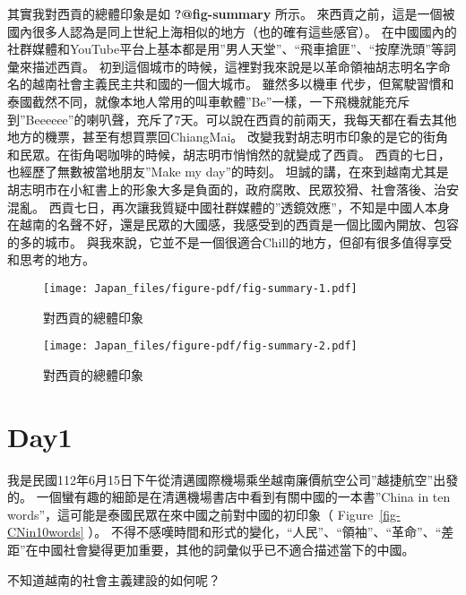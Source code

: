 \documentclass[
  a4paper,
]{ctexart}
\begin{document}
其實我對西貢的總體印象是如 \textbf{?@fig-summary} 所示。
來西貢之前，這是一個被國內很多人認為是同上世紀上海相似的地方（也的確有這些感官）。
在中國國內的社群媒體和YouTube平台上基本都是用''男人天堂''、``飛車搶匪''、``按摩洗頭''等詞彙來描述西貢。
初到這個城市的時候，這裡對我來說是以革命領袖胡志明名字命名的越南社會主義民主共和國的一個大城市。
雖然多以機車🛵代步，但駕駛習慣和泰國截然不同，就像本地人常用的叫車軟體''Be''一樣，一下飛機就能充斥到''Beeeeee''的喇叭聲，充斥了7天。可以說在西貢的前兩天，我每天都在看去其他地方的機票，甚至有想買票回ChiangMai。
改變我對胡志明市印象的是它的街角和民眾。在街角喝咖啡的時候，胡志明市悄悄然的就變成了西貢。
西貢的七日，也經歷了無數被當地朋友''Make my day''的時刻。
坦誠的講，在來到越南尤其是胡志明市在小紅書上的形象大多是負面的，政府腐敗、民眾狡猾、社會落後、治安混亂。
西貢七日，再次讓我質疑中國社群媒體的''透鏡效應''，不知是中國人本身在越南的名聲不好，還是民眾的大國感，我感受到的西貢是一個比國內開放、包容的多的城市。
與我來說，它並不是一個很適合Chill的地方，但卻有很多值得享受和思考的地方。

\begin{figure}

{\centering \texttt{[image: Japan\_files/figure-pdf/fig-summary-1.pdf]}

}

\caption{\label{fig-summary-1}對西貢的總體印象}

\end{figure}

\begin{figure}

{\centering \texttt{[image: Japan\_files/figure-pdf/fig-summary-2.pdf]}

}

\caption{\label{fig-summary-2}對西貢的總體印象}

\end{figure}

\hypertarget{day1-1}{%
\section{Day1}\label{day1-1}}

我是民國112年6月15日下午從清邁國際機場乘坐越南廉價航空公司''越捷航空''出發的。
一個蠻有趣的細節是在清邁機場書店中看到有關中國的一本書''China in ten
words''，這可能是泰國民眾在來中國之前對中國的初印象（
Figure~\ref{fig-CNin10words} ）。
不得不感嘆時間和形式的變化，``人民''、``領袖''、``革命''、``差距''在中國社會變得更加重要，其他的詞彙似乎已不適合描述當下的中國。

不知道越南的社會主義建設的如何呢？
\end{document}
